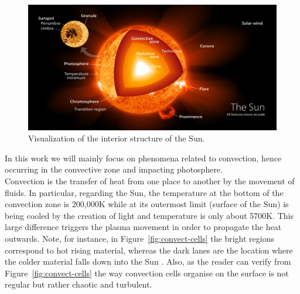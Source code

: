 \begin{figure}[t]
    \centering
    \includegraphics[width=\textwidth]{./pictures/interior.PNG}
    \caption{Visualization of the interior structure of the Sun. \cite{kelvin13}}
    \label{fig:structure}
\end{figure}
In this work we will mainly focus on phenomena related to convection, hence occurring in the convective zone and impacting photosphere.\\
Convection is the transfer of heat from one place to another by the movement of fluids. In particular, regarding the Sun, the temperature at the bottom of the convection zone is 200,000\degree K while at its outermost limit (surface of the Sun) is being cooled by the creation of light and temperature is only about 5700\degree K. This large difference triggers the plasma movement in order to propagate the heat outwards. Note, for instance, in Figure~\ref{fig:convect-cells} the bright regions correspond to hot rising material, whereas the dark lanes are the location where the colder material falls down into the Sun \cite{convect}. Also, as the reader can verify from Figure~\ref{fig:convect-cells} the way convection cells organise on the surface is not regular but rather chaotic and turbulent. \\
